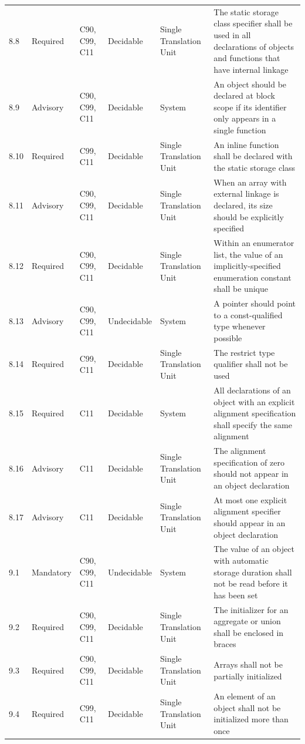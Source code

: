 \documentclass[11pt]{article}
\begin{document}
{\begin{longtable}{@{}p{1.0cm}p{1.6cm}p{1.8cm}p{2.0cm}p{1.6cm}p{7.4cm}@{}}
8.8 & Required & C90, C99, C11 & Decidable & Single Translation Unit & The static storage class specifier shall be used in all declarations of objects and functions that have internal linkage \\
8.9 & Advisory & C90, C99, C11 & Decidable & System & An object should be declared at block scope if its identifier only appears in a single function \\
8.10 & Required & C99, C11 & Decidable & Single Translation Unit & An inline function shall be declared with the static storage class \\
8.11 & Advisory & C90, C99, C11 & Decidable & Single Translation Unit & When an array with external linkage is declared, its size should be explicitly specified \\
8.12 & Required & C90, C99, C11 & Decidable & Single Translation Unit & Within an enumerator list, the value of an implicitly-specified enumeration constant shall be unique \\
8.13 & Advisory & C90, C99, C11 & Undecidable & System & A pointer should point to a const-qualified type whenever possible \\
8.14 & Required & C99, C11 & Decidable & Single Translation Unit & The restrict type qualifier shall not be used \\
8.15 & Required & C11 & Decidable & System & All declarations of an object with an explicit alignment specification shall specify the same alignment \\
8.16 & Advisory & C11 & Decidable & Single Translation Unit & The alignment specification of zero should not appear in an object declaration \\
8.17 & Advisory & C11 & Decidable & Single Translation Unit & At most one explicit alignment specifier should appear in an object declaration \\
9.1 & Mandatory & C90, C99, C11 & Undecidable & System & The value of an object with automatic storage duration shall not be read before it has been set \\
9.2 & Required & C90, C99, C11 & Decidable & Single Translation Unit & The initializer for an aggregate or union shall be enclosed in braces \\
9.3 & Required & C90, C99, C11 & Decidable & Single Translation Unit & Arrays shall not be partially initialized \\
9.4 & Required & C99, C11 & Decidable & Single Translation Unit & An element of an object shall not be initialized more than once \\

\end{longtable}}
\end{document}
